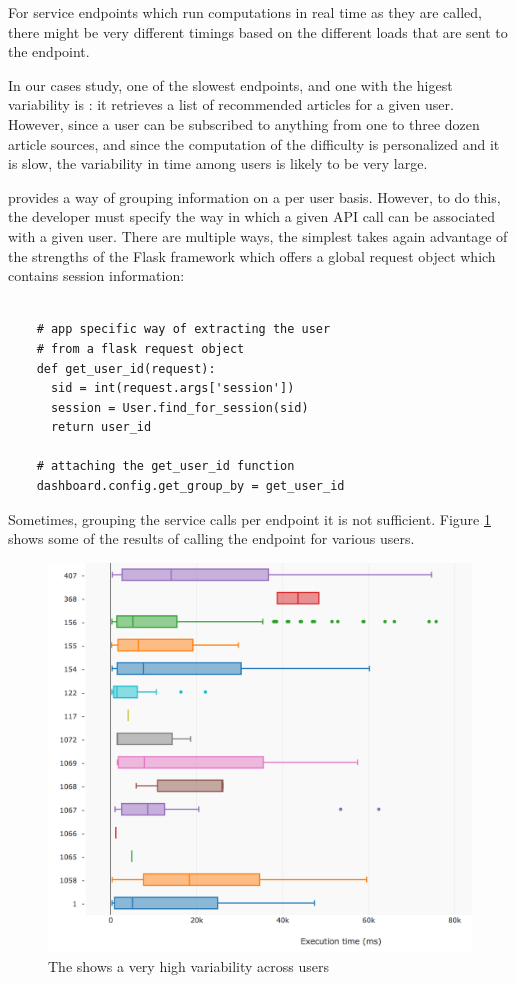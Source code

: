 \documentclass[conference]{IEEEtran}
\begin{document}
  For service endpoints which run computations in real time as they are called, there might be very different timings based on the different loads that are sent to the endpoint. 

  In our cases study, one of the slowest endpoints, and one with the higest variability is \epFeedItems: it retrieves a list of recommended articles for a given user. However, since a user can be subscribed to anything from one to three dozen article sources, and since the computation of the difficulty is personalized and it is slow, the variability in time among users is likely to be very large. 

  \tool provides a way of grouping information on a per user basis. However, to do this, the developer must specify the way in which a given API call can be associated with a given user. There are multiple ways, the simplest takes again advantage of the strengths of the Flask framework which offers a global request object which contains session information: 

  \begin{lstlisting}[float,caption=TBA,style=custompython]
    
    # app specific way of extracting the user
    # from a flask request object    
    def get_user_id(request):
      sid = int(request.args['session'])
      session = User.find_for_session(sid)
      return user_id

    # attaching the get_user_id function
    dashboard.config.get_group_by = get_user_id

  \end{lstlisting}


  Sometimes, grouping the service calls per endpoint it is not sufficient. Figure \ref{fig:tpu} shows some of the results of calling the \epFeedItems endpoint for various users. 

  \begin{figure}[h!]
    \centering
    \includegraphics[width=\linewidth]{time_per_user}
    \caption{The \epFeedItems shows a very high variability across users}
    \label{fig:tpu}
  \end{figure}
\end{document}
